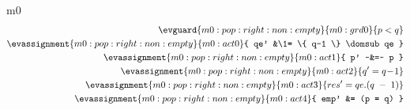 \documentclass[12pt]{amsart}
\begin{document}
\begin{machine}{m0}
\begin{align*}
\evguard{m0:pop:right:non:empty}{m0:grd0}
	{ p < q }
\\ \evassignment{m0:pop:right:non:empty}{m0:act0}
	{ qe' &\1= \{ q-1 \} \domsub qe }
\\ \evassignment{m0:pop:right:non:empty}{m0:act1}
	{ p' ~&=~ p }
\\ \evassignment{m0:pop:right:non:empty}{m0:act2}
	{ q' = q\0-1 }
\\ \evassignment{m0:pop:right:non:empty}{m0:act3}
	{ res' = qe.(q\1-1) }
\\ \evassignment{m0:pop:right:non:empty}{m0:act4}
	{ emp' &= (p = q) }
\end{align*}



\end{machine}

\newcommand{\REQ}{\text{Req}}
\end{document}
